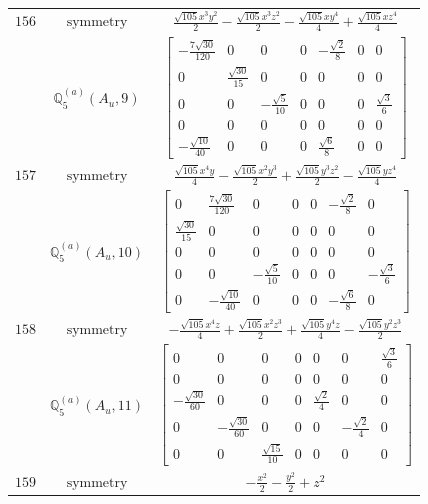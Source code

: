 \documentclass[fleqn,8pt,landscape]{jsarticle}
\begin{document}
\begin{longtable}{ccc}
$ 156 $ & $ \text{symmetry} $ & $ \frac{\sqrt{105} x^{3} y^{2}}{2} - \frac{\sqrt{105} x^{3} z^{2}}{2} - \frac{\sqrt{105} x y^{4}}{4} + \frac{\sqrt{105} x z^{4}}{4} $ \\
$  $ & $ \mathbb{Q}_{5}^{(a)}(A_{u},9) $ & $ \begin{bmatrix} - \frac{7 \sqrt{30}}{120} & 0 & 0 & 0 & - \frac{\sqrt{2}}{8} & 0 & 0 \\ 0 & \frac{\sqrt{30}}{15} & 0 & 0 & 0 & 0 & 0 \\ 0 & 0 & - \frac{\sqrt{5}}{10} & 0 & 0 & 0 & \frac{\sqrt{3}}{6} \\ 0 & 0 & 0 & 0 & 0 & 0 & 0 \\ - \frac{\sqrt{10}}{40} & 0 & 0 & 0 & \frac{\sqrt{6}}{8} & 0 & 0 \end{bmatrix} $ \\ \hline
$ 157 $ & $ \text{symmetry} $ & $ \frac{\sqrt{105} x^{4} y}{4} - \frac{\sqrt{105} x^{2} y^{3}}{2} + \frac{\sqrt{105} y^{3} z^{2}}{2} - \frac{\sqrt{105} y z^{4}}{4} $ \\
$  $ & $ \mathbb{Q}_{5}^{(a)}(A_{u},10) $ & $ \begin{bmatrix} 0 & \frac{7 \sqrt{30}}{120} & 0 & 0 & 0 & - \frac{\sqrt{2}}{8} & 0 \\ \frac{\sqrt{30}}{15} & 0 & 0 & 0 & 0 & 0 & 0 \\ 0 & 0 & 0 & 0 & 0 & 0 & 0 \\ 0 & 0 & - \frac{\sqrt{5}}{10} & 0 & 0 & 0 & - \frac{\sqrt{3}}{6} \\ 0 & - \frac{\sqrt{10}}{40} & 0 & 0 & 0 & - \frac{\sqrt{6}}{8} & 0 \end{bmatrix} $ \\ \hline
$ 158 $ & $ \text{symmetry} $ & $ - \frac{\sqrt{105} x^{4} z}{4} + \frac{\sqrt{105} x^{2} z^{3}}{2} + \frac{\sqrt{105} y^{4} z}{4} - \frac{\sqrt{105} y^{2} z^{3}}{2} $ \\
$  $ & $ \mathbb{Q}_{5}^{(a)}(A_{u},11) $ & $ \begin{bmatrix} 0 & 0 & 0 & 0 & 0 & 0 & \frac{\sqrt{3}}{6} \\ 0 & 0 & 0 & 0 & 0 & 0 & 0 \\ - \frac{\sqrt{30}}{60} & 0 & 0 & 0 & \frac{\sqrt{2}}{4} & 0 & 0 \\ 0 & - \frac{\sqrt{30}}{60} & 0 & 0 & 0 & - \frac{\sqrt{2}}{4} & 0 \\ 0 & 0 & \frac{\sqrt{15}}{10} & 0 & 0 & 0 & 0 \end{bmatrix} $ \\ \hline
$ 159 $ & $ \text{symmetry} $ & $ - \frac{x^{2}}{2} - \frac{y^{2}}{2} + z^{2} $ \\

\end{longtable}
\end{document}
